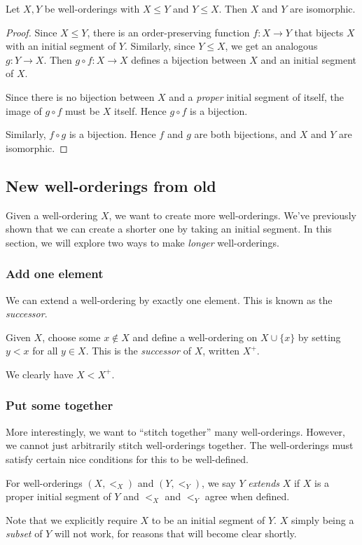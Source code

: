 \documentclass[a4paper]{article}
\begin{document}
\begin{thm}
  Let $X, Y$ be well-orderings with $X\leq Y$ and $Y \leq X$. Then $X$ and $Y$ are isomorphic.
\end{thm}

\begin{proof}
  Since $X \leq Y$, there is an order-preserving function $f: X\to Y$ that bijects $X$ with an initial segment of $Y$. Similarly, since $Y \leq X$, we get an analogous $g: Y\to X$. Then $g\circ f: X\to X$ defines a bijection between $X$ and an initial segment of $X$.

  Since there is no bijection between $X$ and a \emph{proper} initial segment of itself, the image of $g\circ f$ must be $X$ itself. Hence $g\circ f$ is a bijection.

  Similarly, $f\circ g$ is a bijection. Hence $f$ and $g$ are both bijections, and $X$ and $Y$ are isomorphic.
\end{proof}

\subsection{New well-orderings from old}
Given a well-ordering $X$, we want to create more well-orderings. We've previously shown that we can create a shorter one by taking an initial segment. In this section, we will explore two ways to make \emph{longer} well-orderings.

\subsubsection*{Add one element}
We can extend a well-ordering by exactly one element. This is known as the \emph{successor}.
\begin{defi}[Successor]
  Given $X$, choose some $x\not\in X$ and define a well-ordering on $X\cup \{x\}$ by setting $y < x$ for all $y \in X$. This is the \emph{successor} of $X$, written $X^+$.
\end{defi}
We clearly have $X < X^+$.
\subsubsection*{Put some together}
More interestingly, we want to ``stitch together'' many well-orderings. However, we cannot just arbitrarily stitch well-orderings together. The well-orderings must satisfy certain nice conditions for this to be well-defined.

\begin{defi}[Extension]
  For well-orderings $(X, <_X)$ and $(Y, <_Y)$, we say $Y$ \emph{extends} $X$ if $X$ is a proper initial segment of $Y$ and $<_X$ and $<_Y$ agree when defined.
\end{defi}
Note that we explicitly require $X$ to be an initial segment of $Y$. $X$ simply being a \emph{subset} of $Y$ will not work, for reasons that will become clear shortly.
\end{document}
